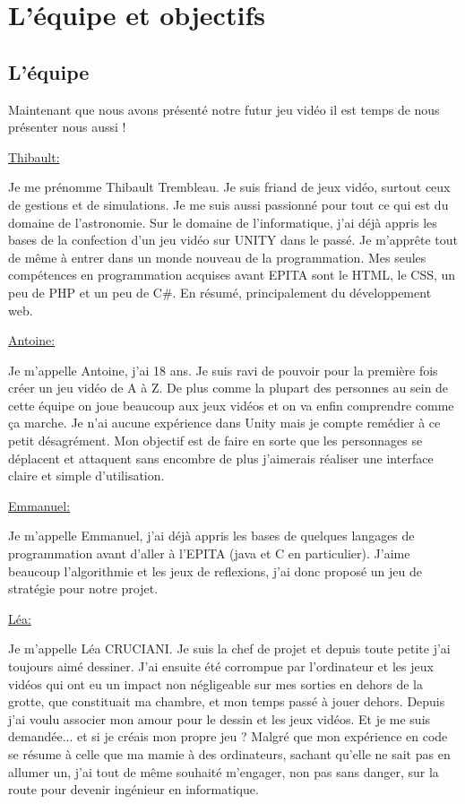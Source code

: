 \documentclass[12pt]{extarticle}
\begin{document}
\section{L'équipe et objectifs}

\subsection{L'équipe}

Maintenant que nous avons présenté notre futur jeu vidéo il est temps de nous présenter nous aussi !

\vspace{0.5cm}
\underline{Thibault:}

Je me prénomme Thibault Trembleau. Je suis friand de jeux vidéo, surtout ceux de gestions et de simulations. Je me suis aussi passionné pour tout ce qui est du domaine de l'astronomie. Sur le domaine de l'informatique, j'ai déjà appris les bases de la confection d'un jeu vidéo sur UNITY dans le passé. Je m'apprête tout de même à entrer dans un monde nouveau de la programmation. Mes seules compétences en programmation acquises avant EPITA sont le HTML, le CSS, un peu de PHP et un peu de C\#. En résumé, principalement du développement web.

\newpage
\underline{Antoine:}

Je m’appelle Antoine, j’ai 18 ans. Je suis ravi de pouvoir pour la première fois créer un jeu vidéo de A à Z. De plus comme la plupart des personnes au sein de cette équipe on joue beaucoup aux jeux vidéos et on va enfin comprendre comme ça marche. Je n’ai aucune expérience dans Unity mais je compte remédier à ce petit désagrément. Mon objectif est de faire en sorte que les personnages se déplacent et attaquent sans encombre de plus j'aimerais réaliser une interface claire et simple d'utilisation.

\vspace{0.5cm}
\underline{Emmanuel:}

Je m'appelle Emmanuel, j'ai déjà appris les bases de quelques langages de programmation avant d'aller à l'EPITA (java et C en particulier). J'aime beaucoup l'algorithmie et les jeux de reflexions, j'ai donc proposé un jeu de stratégie pour notre projet.

\vspace{0.5cm}
\underline{Léa:}

Je m'appelle Léa CRUCIANI. Je suis la chef de projet et depuis toute petite j'ai toujours aimé dessiner. J'ai ensuite été corrompue par l'ordinateur et les jeux vidéos qui ont eu un impact non négligeable sur mes sorties en dehors de la grotte, que constituait ma chambre, et mon temps passé à jouer dehors. Depuis j'ai voulu associer mon amour pour le dessin et les jeux vidéos. Et je me suis demandée... et si je créais mon propre jeu ? Malgré que mon expérience en code se résume à celle que ma mamie à des ordinateurs, sachant qu'elle ne sait pas en allumer un, j'ai tout de même souhaité m'engager, non pas sans danger, sur la route pour devenir ingénieur en informatique.
\end{document}
